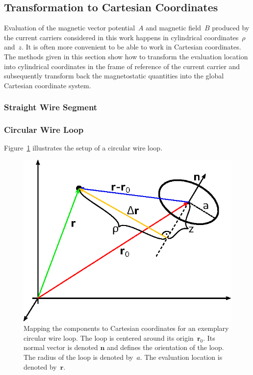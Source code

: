 \subsection{Transformation to Cartesian Coordinates}
Evaluation of the magnetic vector potential~$A$ and magnetic field~$B$
produced by the current carriers considered in this work
happens in cylindrical coordinates~$\rho$ and~$z$.
It is often more convenient to be able to work in Cartesian coordinates.
The methods given in this section show how to transform the evaluation location
into cylindrical coordinates in the frame of reference of the current carrier
and subsequently transform back the magnetostatic quantities into the global Cartesian coordinate system.

\subsubsection{Straight Wire Segment}



\subsubsection{Circular Wire Loop}
Figure~\ref{fig:mappingToCartesian} illustrates the setup of a circular wire loop.
\begin{figure}[htbp]
 \centering
 \includegraphics{img/MappingToCartesian.eps}
 \caption{Mapping the components to Cartesian coordinates for an exemplary circular wire loop.
          The loop is centered around its origin~$\mathbf{r}_0$.
          Its normal vector is denoted $\mathbf{n}$ and defines the orientation of the loop.
          The radius of the loop is denoted by~$a$.
          The evaluation location is denoted by~$\mathbf{r}$.}
 \label{fig:mappingToCartesian}
\end{figure}


